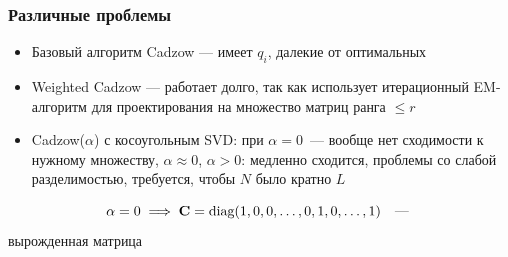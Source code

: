 \documentclass[unicode, notheorems]{beamer}
\begin{document}
\begin{frame}
	\frametitle{Различные проблемы}
	\begin{itemize}
		\item Базовый алгоритм Cadzow --- имеет $q_i$, далекие от оптимальных
		\item Weighted Cadzow --- работает долго, так как использует итерационный EM-алгоритм для проектирования на множество матриц ранга $\le r$
		\item Cadzow($\alpha$) с косоугольным SVD: при $\alpha = 0$~--- вообще нет сходимости к нужному множеству, $\alpha \approx 0$, $\alpha > 0$: медленно сходится, проблемы со слабой разделимостью, требуется, чтобы $N$ было кратно $L$
	\end{itemize}
	\begin{equation*}
	\alpha = 0 \implies \mathbf{C} = \text{diag}(1, 0, 0, \ldots, 0, 1, 0, \ldots, 1) \quad \text{--- }
	\end{equation*}
	вырожденная матрица
\end{frame}


\end{document}
